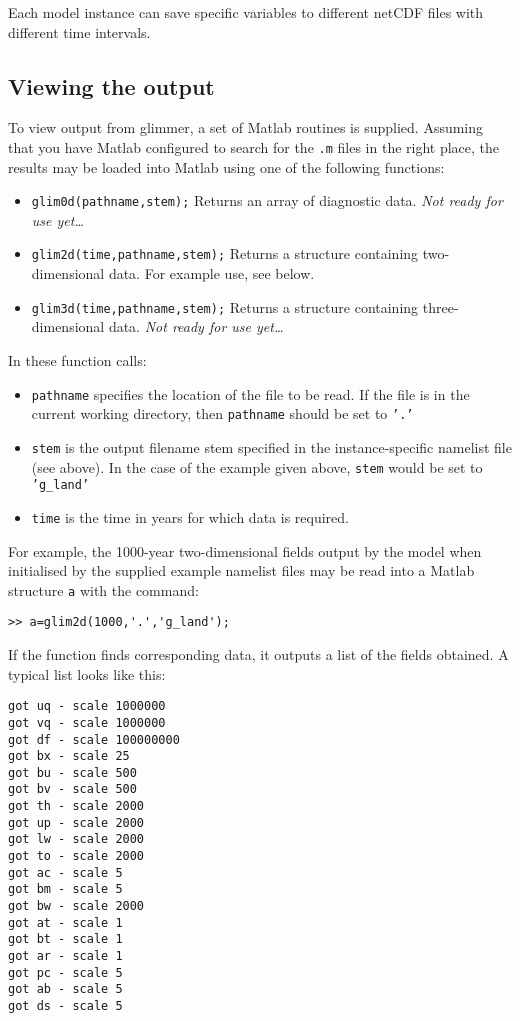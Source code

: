 Each model instance can save specific variables to different netCDF files with different time intervals.

\subsection{Viewing the output}
%
To view output from glimmer, a set of Matlab routines is supplied. Assuming
that you have Matlab configured to search for the \texttt{.m} files in the
right place, the results may be loaded into Matlab using one of the following
functions:
%
\begin{itemize}
\item \texttt{glim0d(pathname,stem);} Returns an array of diagnostic
  data. \emph{Not ready for use yet\ldots}
\item \texttt{glim2d(time,pathname,stem);} Returns a structure containing
  two-dimensional data. For example use, see below.
\item \texttt{glim3d(time,pathname,stem);} Returns a structure containing
  three-dimensional data. \emph{Not ready for use yet\ldots}
\end{itemize}
%
In these function calls:
\begin{itemize}
\item \texttt{pathname} specifies the location of the file
to be read. If the file is in the current working directory, then
\texttt{pathname} should be set to \texttt{'.'}
\item \texttt{stem} is the output filename stem specified in the
  instance-specific namelist file (see above). In the case of the example
  given above, \texttt{stem} would be set to \texttt{'g\_land'}
\item \texttt{time} is the time in years for which data is required.
\end{itemize}
%
For example, the 1000-year two-dimensional fields output by the model when initialised
by the supplied example namelist files may be read into a Matlab structure
\texttt{a} with the command:
%
\begin{verbatim}
>> a=glim2d(1000,'.','g_land');
\end{verbatim}
%
If the function finds corresponding data, it outputs a list of the fields
obtained. A typical list looks like this:
%
\begin{verbatim}
got uq - scale 1000000
got vq - scale 1000000
got df - scale 100000000
got bx - scale 25
got bu - scale 500
got bv - scale 500
got th - scale 2000
got up - scale 2000
got lw - scale 2000
got to - scale 2000
got ac - scale 5
got bm - scale 5
got bw - scale 2000
got at - scale 1
got bt - scale 1
got ar - scale 1
got pc - scale 5
got ab - scale 5
got ds - scale 5
\end{verbatim}
